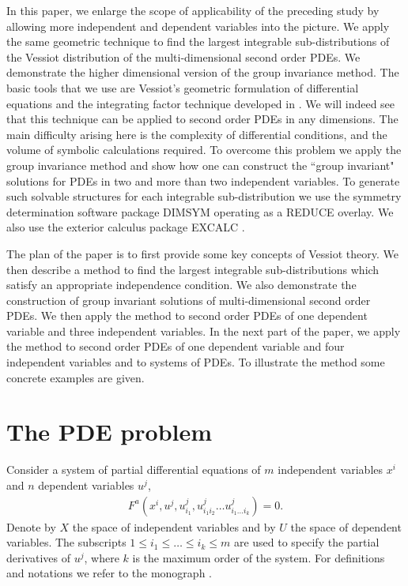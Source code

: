\documentclass[a4paper, 11pt]{amsart}
\theoremstyle{definition}
\begin{document}
In this paper, we enlarge the scope of applicability of the preceding study by allowing more independent and dependent variables into the picture. We apply the same geometric technique to find the largest integrable sub-distributions of the Vessiot distribution of the multi-dimensional second order PDEs. We demonstrate the higher dimensional version of the group invariance method. The basic tools that we use are Vessiot's geometric formulation of differential equations \cite{Vessiot1924} and the integrating factor technique developed in \cite{sherr}.  We will indeed see that this technique can be applied to second order PDEs in any dimensions. The main difficulty arising here is the complexity of differential conditions, and the volume of symbolic calculations required. To overcome this problem we apply the group invariance method and show how one can construct the ``group invariant" solutions for PDEs in two and more than two independent variables. To generate such solvable structures for each integrable sub-distribution we use the symmetry determination software package DIMSYM \cite{sherrdimsym} operating as a REDUCE \cite{Reduce}  overlay. We also use the exterior calculus package EXCALC \cite{Sexcalc}.

The plan of the paper is to first provide some key concepts of Vessiot theory. We then describe a method to find the largest integrable sub-distributions which satisfy an appropriate independence condition. We also demonstrate the construction of group invariant solutions of multi-dimensional second order PDEs. We then apply the method to second order PDEs of one dependent variable and three independent variables. In the next part of the paper, we apply the method to second order PDEs of one dependent variable and four independent variables and to systems of PDEs. To illustrate the method some concrete examples are given.

\section{The PDE problem}
\noindent Consider a system of partial differential equations  of $m$ independent variables $x^i$ and $n$ dependent variables  $u^j$,
\begin{align}F^a(x^i,u^j,u^j_{i_1},u^j_{i{_1}i{_2}}\ldots u^j_{i_1\ldots i_k})=0. \label{eqn:g.pde}\end{align} Denote by $X$ the space of independent variables and by $U$ the space of dependent variables. The subscripts $1\leq i_1\leq\ldots \leq i_k\leq m$ are used to specify the partial derivatives of $u^j$, where $k$ is the maximum order of the system. For definitions and notations we refer to the monograph \cite{Stormark}.
\end{document}
